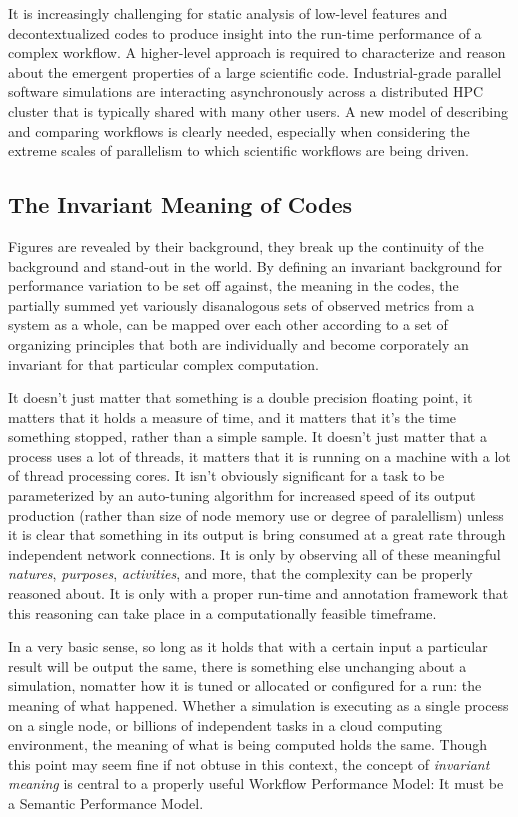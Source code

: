 It is increasingly challenging for static analysis of low-level
features and decontextualized codes to produce insight into the
run-time performance of a complex workflow.  A higher-level approach
is required to characterize and reason about the emergent properties
of a large scientific code. Industrial-grade parallel software
simulations are interacting asynchronously across a distributed HPC
cluster that is typically shared with many other users. A new model of
describing and comparing workflows is clearly needed, especially when
considering the extreme scales of parallelism to which scientific
workflows are being driven.



\subsection{The Invariant Meaning of Codes}

Figures are revealed by their background, they break up the continuity
of the background and stand-out in the world. By defining an invariant
background for performance variation to be set off against, the
meaning in the codes, the partially summed yet variously disanalogous
sets of observed metrics from a system as a whole, can be mapped over
each other according to a set of organizing principles that both are
individually and become corporately an invariant for that particular
complex computation.

It doesn't just matter that something is a double precision floating
point, it matters that it holds a measure of time, and it matters that
it's the time something stopped, rather than a simple sample.  It
doesn't just matter that a process uses a lot of threads, it matters
that it is running on a machine with a lot of thread processing
cores. It isn't obviously significant for a task to be parameterized
by an auto-tuning algorithm for increased speed of its output
production (rather than size of node memory use or degree of
paralellism) unless it is clear that something in its output is bring
consumed at a great rate through independent network connections. It is only by
observing all of these meaningful \textit{natures}, \textit{purposes},
\textit{activities}, and more, that the complexity can be properly reasoned
about. It is only with a proper run-time and annotation framework that
this reasoning can take place in a computationally feasible timeframe.

In a very basic sense, so long as it holds that with a certain input a
particular result will be output the same, there is something else
unchanging about a simulation, nomatter how it is tuned or allocated
or configured for a run: the meaning of what happened.  Whether a
simulation is executing as a single process on a single node, or
billions of independent tasks in a cloud computing environment, the
meaning of what is being computed holds the same. Though this point
may seem fine if not obtuse in this context, the concept
of \textit{invariant meaning} is central to a properly useful Workflow
Performance Model: It must be a Semantic Performance Model.

